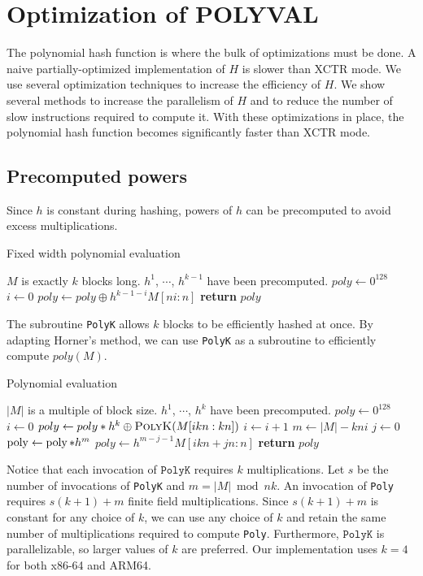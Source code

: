 \documentclass[hctr.tex]{subfiles}
\begin{document}
\section{Optimization of POLYVAL}\label{polyvalimpl}
The polynomial hash function is where the bulk of optimizations must be done. A naive partially-optimized implementation of $H$ is slower than XCTR mode. We use several optimization techniques to increase the efficiency of $H$. We show several methods to increase the parallelism of $H$ and to reduce the number of slow instructions required to compute it. With these optimizations in place, the polynomial hash function becomes significantly faster than XCTR mode.

\subsection{Precomputed powers}
Since $h$ is constant during hashing, powers of $h$ can be precomputed to avoid excess multiplications. 
\begin{algorithm}[H]
\caption{Fixed width polynomial evaluation}\label{polykalg}
\begin{algorithmic}[1]
	\Require $M$ is exactly $k$ blocks long.
	\Require $h^1$, $\cdots$, $h^{k-1}$ have been precomputed.
		\State $poly \gets 0^{128}$
		\State $i \gets 0$
		\State $poly \gets poly \oplus h^{k-1-i}M[ni:n]$
		\EndFor
		\State \textbf{return} $poly$
	\EndProcedure
\end{algorithmic}
\end{algorithm}
The subroutine \texttt{PolyK} allows $k$ blocks to be efficiently hashed at once. By adapting Horner's method, we can use \texttt{PolyK} as a subroutine to efficiently compute $poly(M)$.

\begin{algorithm}[H]
\caption{Polynomial evaluation}\label{polyalg}
\begin{algorithmic}[1]
	\Require $|M|$ is a multiple of block size.
	\Require $h^1$, $\cdots$, $h^{k}$ have been precomputed.
		\State $poly \gets 0^{128}$
		\State $i \gets 0$
			\State $poly \gets poly*h^k \oplus \Call{PolyK}{M[ikn : kn]}$
			\State $i \gets i + 1$
		\EndWhile
		\State $m \gets |M| - kni$
		\State $j \gets 0$
		\State $\operatorname{poly} \gets \operatorname{poly}*h^m$
		\State $poly \gets h^{m-j-1}M[ikn + jn : n]$
		\EndWhile
		\State \textbf{return} $poly$
	\EndProcedure
\end{algorithmic}
\end{algorithm}
Notice that each invocation of $\texttt{PolyK}$ requires $k$ multiplications. Let $s$ be the number of invocations of \texttt{PolyK} and $m = |M| \bmod nk$. An invocation of \texttt{Poly} requires $s(k+1) + m$ finite field multiplications. Since $s(k+1) + m$ is constant for any choice of $k$, we can use any choice of $k$ and retain the same number of multiplications required to compute \texttt{Poly}. Furthermore, $\texttt{PolyK}$ is parallelizable, so larger values of $k$ are preferred. Our implementation uses $k = 4$ for both x86-64 and ARM64.
\end{document}
